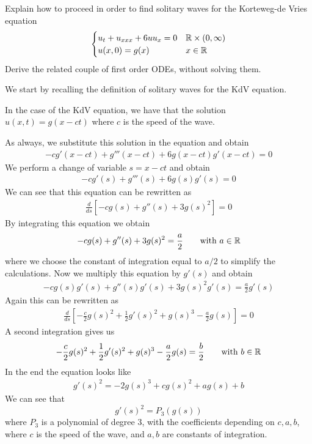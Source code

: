 \newpage
\begin{exercise}
    Explain how to proceed in order to find solitary waves for the Korteweg-de Vries equation
    \[
        \begin{cases}
            u_t + u_{xxx} + 6 u u_x = 0 & \mathbb{R} \times (0, \infty) \\
            u(x, 0) = g(x) & x \in \mathbb{R}
        \end{cases}
    \]
    Derive the related couple of first order ODEs, without solving them.
\end{exercise}
We start by recalling the definition of solitary waves for the KdV equation.
\begin{remark}
    In the case of the KdV equation, we have that the solution \(u(x,t) =  g(x - ct)\) where \(c\) is the speed of the wave.
\end{remark}
As always, we substitute this solution in the equation and obtain
\[
    \begin{split}
        -c g'(x - ct) + g'''(x - ct) + 6 g(x - ct) g'(x - ct) = 0
    \end{split}
\]
We perform a change of variable \(s = x - ct\) and obtain
\[
    \begin{split}
        -c g'(s) + g'''(s) + 6 g(s) g'(s) = 0
    \end{split}
\]
We can see that this equation can be rewritten as
\[
    \begin{split}
        \frac{d}{ds}\left[-c g(s) + g''(s) + 3 g(s)^2\right] = 0
    \end{split}
\]
By integrating this equation we obtain
\[
    \begin{split}
        -c g(s) + g''(s) + 3 g(s)^2 = \frac{a}{2} \qquad \text{with } a \in \mathbb{R}
    \end{split}
\]
where we choose the constant of integration equal to \(a/2\) to simplify the calculations. Now we multiply this equation by \(g'(s)\) and obtain
\[
    \begin{split}
        -c g(s) g'(s) + g''(s) g'(s) + 3 g(s)^2 g'(s) = \frac{a}{2} g'(s)
    \end{split}
\]
Again this can be rewritten as
\[
    \begin{split}
        \frac{d}{ds}\left[-\frac{c}{2} g(s)^2 + \frac{1}{2} g'(s)^2 + g(s)^3 - \frac{a}{2} g(s)\right] = 0
    \end{split}
\]
A second integration gives us
\[
    \begin{split}
        -\frac{c}{2} g(s)^2 + \frac{1}{2} g'(s)^2 + g(s)^3 - \frac{a}{2} g(s) = \frac{b}{2} \qquad \text{with } b \in \mathbb{R}
    \end{split}
\]
In the end the equation looks like
\[
    \begin{split}
        g'(s)^2 = -2 g(s)^3 + c g(s)^2 + a g(s) + b
    \end{split}
\]
We can see that 
\[
    g'(s)^2 = P_3(g(s)) 
\]
where \(P_3\) is a polynomial of degree 3, with the coefficients depending on \(c, a, b\), where \(c\) is the speed of the wave, and \(a, b\) are constants of integration.

